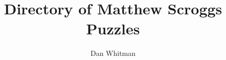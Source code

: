 \documentclass{article}
\begin{document}
\title{Directory of Matthew Scroggs Puzzles}
\author{Dan Whitman}
\date{}

\maketitle


\end{document}
